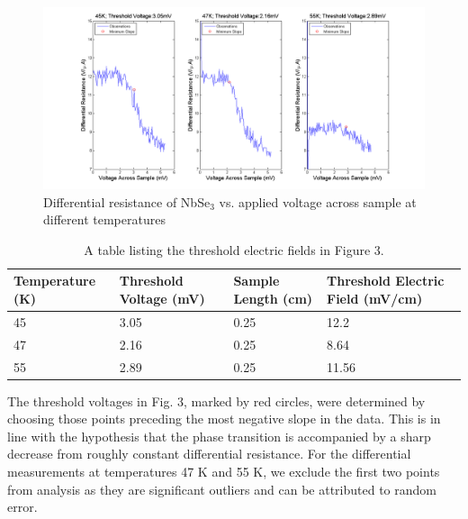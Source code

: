 \documentclass[aps,prl,nofootinbib,twocolumn,superscriptaddress,groupedaddress]{revtex4}  %
\begin{document}
\onecolumngrid

\begin{center}
\begin{figure}[h]
\centering
\includegraphics[scale=0.5]{../Analysis/../Analysis/ACCurrentVersusVoltage.png} 
\caption{Differential resistance of NbSe$_{3}$ vs. applied voltage across sample at different temperatures}
\end{figure}
\end{center}

\twocolumngrid

\begin{table}[h]
\caption{\label{tab:table3} A table listing the threshold electric fields in Figure 3.}
\begin{ruledtabular}
\begin{tabular}{p{2cm}p{2cm}p{2cm}p{2cm}}
Temperature (K) & Threshold Voltage (mV) & Sample Length (cm) & Threshold Electric Field (mV/cm)\\
\hline
45 & 3.05 & 0.25 & 12.2\\
47 & 2.16 & 0.25 & 8.64\\
55 & 2.89 & 0.25 & 11.56\\
\end{tabular}
\end{ruledtabular}
\end{table}

\noindent The threshold voltages in Fig. 3, marked by red circles, were determined by choosing those points preceding the most negative slope in the data. This is in line with the hypothesis that the phase transition is accompanied by a sharp decrease from roughly constant differential resistance. For the differential measurements at temperatures 47 K and 55 K, we exclude the first two points from analysis as they are significant outliers and can be attributed to random error.
\end{document}
